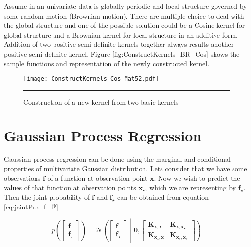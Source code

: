 Assume in an univariate data is globally periodic and local structure governed by some random motion (Brownian motion). There are multiple choice to deal with the global structure and one of the possible solution could be a Cosine kernel for global structure and a Brownian kernel for local structure in an additive form. Addition of two positive semi-definite kernels together always results another positive semi-definite kernel. Figure \ref{fig:ConstructKernels_BR_Cos} shows the sample functions and representation of the newly constructed kernel.

\begin{figure}[t]
	\centering
		\texttt{[image: ConstructKernels\_Cos\_Mat52.pdf]}
		\rule{35em}{0.5pt}
	\caption[Construction of a new kernel from two basic kernels]
		{Construction of a new kernel from two basic kernels} %
	\label{fig:ConstructKernels}
\end{figure}

\section{Gaussian Process Regression}
Gaussian process regression can be done using the marginal and conditional properties of multivariate Gaussian distribution. Lets consider that we have some observations $\mathbf{f}$ of a function at observation point $\mathbf{x}$. Now we wish to predict the values of that function at observation points $\mathbf{x_\star}$, which we are representing by $\mathbf{f_\star}$. Then the joint probability of $\mathbf{f}$ and $\mathbf{f_\star}$ can be obtained from equation \ref{eq:jointPro_f_f*}-

\begin{equation} \label{eq:jointPro_f_f*}
p \left( \begin{bmatrix} \mathbf{f} \\\mathbf{f_\star} \end{bmatrix} \right) =
\mathcal{N}\left( \begin{bmatrix} \mathbf{f} \\\mathbf{f_\star} \end{bmatrix} \middle|
\mathbf{0}, \begin{bmatrix} \mathbf{K_{x,x}} & \mathbf{K_{x,x_\star}} \\
			    \mathbf{K_{x_\star,x}} & \mathbf{K_{x_\star,x_\star}} \end{bmatrix} \right)
\end{equation}

